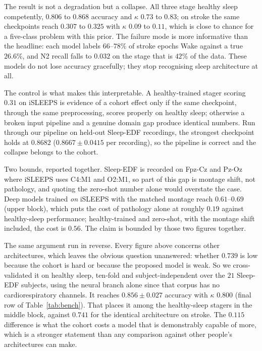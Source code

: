 \documentclass{ieeeaccess}
\newcommand{\mmAcc}{0.739}   %
\begin{document}
The result is not a degradation but a collapse. All three stage healthy sleep competently,
$0.806$ to $0.868$ accuracy and $\kappa$ $0.73$ to $0.83$; on stroke the same checkpoints reach
$0.307$ to $0.325$ with $\kappa$ $0.09$ to $0.11$, which is close to chance for a five-class
problem with this prior. The failure mode is more informative than the headline: each model
labels $66$--$78\%$ of stroke epochs Wake against a true $26.6\%$, and N2 recall falls to
$0.032$ on the stage that is $42\%$ of the data. These models do not lose accuracy gracefully;
they stop recognising sleep architecture at all.

The control is what makes this interpretable. A healthy-trained stager scoring $0.31$
on iSLEEPS is evidence of a cohort effect only if the same checkpoint, through the same
preprocessing, scores properly on healthy sleep; otherwise a broken input pipeline and a
genuine domain gap produce identical numbers. Run through our pipeline on held-out Sleep-EDF
recordings, the strongest checkpoint holds at $0.8682$ ($0.8667 \pm 0.0415$ per recording), so
the pipeline is correct and the collapse belongs to the cohort.

Two bounds, reported together. Sleep-EDF is recorded on Fpz-Cz and Pz-Oz where iSLEEPS
uses C4:M1 and O2:M1, so part of this gap is montage shift, not pathology, and quoting
the zero-shot number alone would overstate the case. Deep models trained \emph{on} iSLEEPS with
the matched montage reach $0.61$--$0.69$ (upper block), which puts the cost of
pathology alone at roughly $0.19$ against healthy-sleep performance; healthy-trained and
zero-shot, with the montage shift included, the cost is $0.56$. The claim is bounded by those two figures together.

The same argument run in reverse. Every figure above concerns other
architectures, which leaves the obvious question unanswered: whether $\mmAcc$ is low
because the cohort is hard or because the proposed model is weak. So we cross-validated it
on healthy sleep, ten-fold and subject-independent over the $21$ Sleep-EDF subjects, using the
neural branch alone since that corpus has no cardiorespiratory channels. It reaches
$0.856 \pm 0.027$ accuracy with $\kappa$ $0.800$ (final row of Table~\ref{tab:bench}).
That places it among the healthy-sleep stagers in the middle block,
against $0.741$ for the identical architecture on stroke. The $0.115$ difference is what
the cohort costs a model that is demonstrably capable of more, which is a stronger
statement than any comparison against other people's architectures can make.
\end{document}
